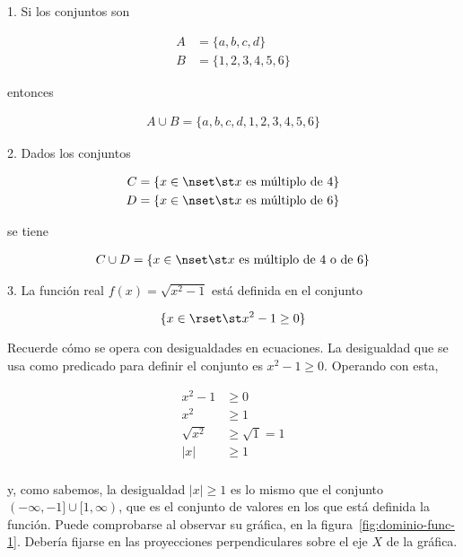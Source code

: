 \begin{example}
  1. Si los conjuntos son

  \begin{align*}
    A &= \{a, b, c, d\} \\
    B &= \{1, 2, 3, 4, 5, 6\}
  \end{align*}

  \noindent entonces

  \begin{align*}
    A \cup B = \{a, b, c, d, 1, 2, 3, 4, 5, 6\}
  \end{align*}

  2. Dados los conjuntos

  \begin{align*}
    C &= \{x \in \nset \st x \ \text{es múltiplo de} \ 4\} \\
    D &= \{x \in \nset \st x \ \text{es múltiplo de} \ 6\} \\
  \end{align*}

  \noindent se tiene

  \begin{align*}
    C \cup D = \{x \in \nset \st x \ \text{es múltiplo de} \ 4 \ \text{o de}
      \ 6\}
  \end{align*}

  3. La función real $f(x) = \sqrt{x^2 - 1}$ está definida en el conjunto

  \[ \{x \in \rset \st x^2 - 1 \geq 0\} \]

  Recuerde cómo se opera con desigualdades en ecuaciones. La desigualdad que
  se usa como predicado para definir el conjunto es $x^2 - 1 \geq 0$.
  Operando con esta,

  \begin{align*}
    x^2 - 1 &\geq 0 \\
    x^2 &\geq 1 \\
    \sqrt{x^2} &\geq \sqrt{1} = 1 \\
    |x| &\geq 1 \\
  \end{align*}

  \noindent y, como sabemos, la desigualdad $|x| \geq 1$ es lo mismo que el
  conjunto $({-\infty}, {-1}] \cup [1, \infty)$, que es el conjunto de
  valores en los que está definida la función. Puede comprobarse al observar
  su gráfica, en la figura~\ref{fig:dominio-func-1}. Debería fijarse en las
  proyecciones perpendiculares sobre el eje $X$ de la gráfica.



\end{example}
